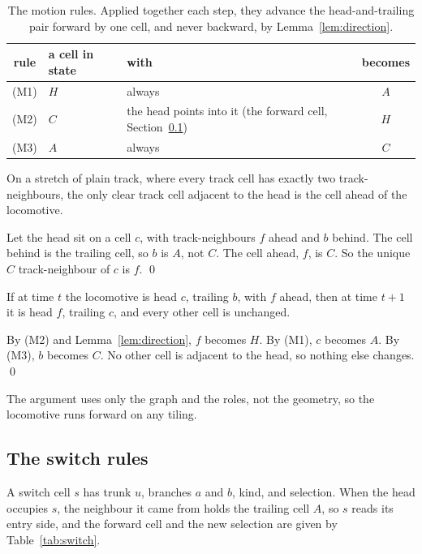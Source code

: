 \begin{table}[ht]
\centering
\begin{tabular}{@{}cllc@{}}
\toprule
rule & a cell in state & with & becomes \\
\midrule
(M1) & $H$ & always & $A$ \\
(M2) & $C$ & the head points into it (the forward cell, Section~\ref{sec:switchrules}) & $H$ \\
(M3) & $A$ & always & $C$ \\
\bottomrule
\end{tabular}
\caption{The motion rules. Applied together each step, they advance the head-and-trailing pair forward by one
cell, and never backward, by Lemma~\ref{lem:direction}.}
\label{tab:motion}
\end{table}

\begin{lemma}[Direction]
\label{lem:direction}
On a stretch of plain track, where every track cell has exactly two track-neighbours, the only clear track cell
adjacent to the head is the cell ahead of the locomotive.
\end{lemma}

Let the head sit on a cell $c$, with track-neighbours $f$ ahead and $b$ behind. The cell behind is the trailing
cell, so $b$ is $A$, not $C$. The cell ahead, $f$, is $C$. So the unique $C$ track-neighbour of $c$ is $f$. \qed

\begin{lemma}[Motion]
\label{lem:motion}
If at time $t$ the locomotive is head $c$, trailing $b$, with $f$ ahead, then at time $t+1$ it is head $f$,
trailing $c$, and every other cell is unchanged.
\end{lemma}

By (M2) and Lemma~\ref{lem:direction}, $f$ becomes $H$. By (M1), $c$ becomes $A$. By (M3), $b$ becomes $C$. No
other cell is adjacent to the head, so nothing else changes. \qed

The argument uses only the graph and the roles, not the geometry, so the locomotive runs forward on any tiling.

\subsection{The switch rules}
\label{sec:switchrules}

A switch cell $s$ has trunk $u$, branches $a$ and $b$, kind, and selection. When the head occupies $s$, the
neighbour it came from holds the trailing cell $A$, so $s$ reads its entry side, and the forward cell and the
new selection are given by Table~\ref{tab:switch}.

